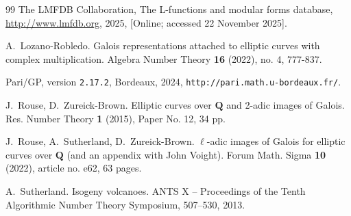 \documentclass{amsart}
\newcommand{\Q}{\mathbf{Q}}
\numberwithin{equation}{section}
\theoremstyle{plain}
\theoremstyle{remark}
\begin{document}
\begin{thebibliography}{99}
 The LMFDB Collaboration, The L-functions and modular forms database, \href{http://www.lmfdb.org}{http://www.lmfdb.org}, 2025, [Online; accessed 22 November 2025].

 A.~Lozano-Robledo.  Galois representations attached to elliptic curves with complex multiplication. Algebra Number Theory \textbf{16} (2022), no. 4, 777-837.

 Pari/GP, version {\tt 2.17.2}, Bordeaux, 2024, {\tt http://pari.math.u-bordeaux.fr/}.

{J.~Rouse, D.~Zureick-Brown.} 
Elliptic curves over $\mathbf{Q}$ and 2-adic images of Galois.
Res. Number Theory \textbf{1} (2015), Paper No. 12, 34 pp.

J.~Rouse, A.~Sutherland, D.~Zureick-Brown. $\ell$-adic images of Galois for elliptic curves over $\Q$ (and an appendix with John Voight). Forum Math. Sigma {\bf 10} (2022), article no. e62, 63 pages.

 A.~Sutherland. Isogeny volcanoes. ANTS X -- Proceedings of the Tenth Algorithmic
Number Theory Symposium, 507--530, 2013.

\end{thebibliography}
\end{document}
